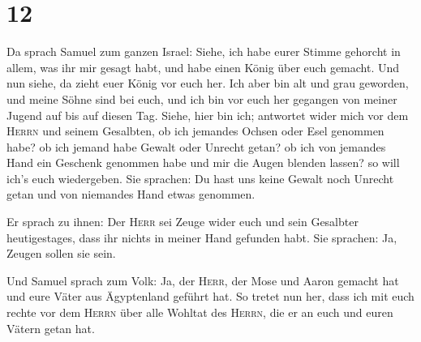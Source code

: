 \hypertarget{section-11}{%
\section{12}\label{section-11}}

 Da sprach Samuel zum ganzen Israel: Siehe, ich habe eurer
Stimme gehorcht in allem, was ihr mir gesagt habt, und habe einen König
über euch gemacht.  Und nun siehe, da zieht euer König vor
euch her. Ich aber bin alt und grau geworden, und meine Söhne sind bei
euch, und ich bin vor euch her gegangen von meiner Jugend auf bis auf
diesen Tag.  Siehe, hier bin ich; antwortet wider mich vor
dem \textsc{Herrn} und seinem Gesalbten, ob ich jemandes Ochsen oder
Esel genommen habe? ob ich jemand habe Gewalt oder Unrecht getan? ob ich
von jemandes Hand ein Geschenk genommen habe und mir die Augen blenden
lassen? so will ich's euch wiedergeben.  Sie sprachen: Du
hast uns keine Gewalt noch Unrecht getan und von niemandes Hand etwas
genommen.

 Er sprach zu ihnen: Der \textsc{Herr} sei Zeuge wider
euch und sein Gesalbter heutigestages, dass ihr nichts in meiner Hand
gefunden habt. Sie sprachen: Ja, Zeugen sollen sie sein.

 Und Samuel sprach zum Volk: Ja, der \textsc{Herr}, der
Mose und Aaron gemacht hat und eure Väter aus Ägyptenland geführt hat.
 So tretet nun her, dass ich mit euch rechte vor dem
\textsc{Herrn} über alle Wohltat des \textsc{Herrn}, die er an euch und
euren Vätern getan hat.

